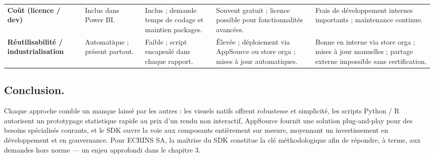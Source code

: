 \begin{sidewaystable}[p]
\begin{tabularx}{\linewidth}{>{\raggedright\arraybackslash\bfseries}p{2.9cm}XXXX}
Coût (licence / dev) &
Inclus dans Power BI. &
Inclus ; demande temps de codage et maintien packages. &
Souvent gratuit ; licence possible pour fonctionnalités avancées. &
Frais de développement internes importants ; maintenance continue.\\[0.4em]

Réutilisabilité / industrialisation &
Automatique ; présent partout. &
Faible ; script encapsulé dans chaque rapport. &
Élevée ; déploiement via AppSource ou store orga ; mises à jour automatiques. &
Bonne en interne via store orga ; mises à jour manuelles ; partage externe impossible sans certification.\\
\bottomrule
\end{tabularx}
\end{sidewaystable}




\subsection{Conclusion.}  
Chaque approche comble un manque laissé par les autres : les visuels natifs offrent robustesse et simplicité, les scripts Python / R autorisent un prototypage statistique rapide au prix d’un rendu non interactif, AppSource fournit une solution plug-and-play pour des besoins spécialisés courants, et le SDK ouvre la voie aux composants entièrement sur mesure, moyennant un investissement en développement et en gouvernance. Pour ECRINS SA, la maîtrise du SDK constitue la clé méthodologique afin de répondre, à terme, aux demandes hors norme — un enjeu approfondi dans le chapitre 3.



